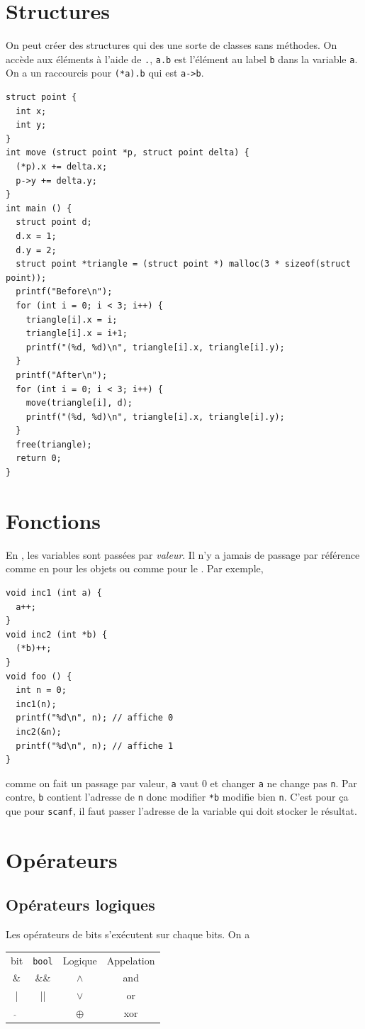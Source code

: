 \section{Structures}
On peut créer des structures qui des une sorte de classes sans méthodes.
On accède aux éléments à l'aide de \lstinline|.|, \lstinline|a.b|
est l'élément au label \lstinline|b| dans la variable \lstinline|a|.
On a un raccourcis pour \lstinline|(*a).b| qui est \lstinline|a->b|.
\begin{lstlisting}
struct point {
  int x;
  int y;
}
int move (struct point *p, struct point delta) {
  (*p).x += delta.x;
  p->y += delta.y;
}
int main () {
  struct point d;
  d.x = 1;
  d.y = 2;
  struct point *triangle = (struct point *) malloc(3 * sizeof(struct point));
  printf("Before\n");
  for (int i = 0; i < 3; i++) {
    triangle[i].x = i;
    triangle[i].x = i+1;
    printf("(%d, %d)\n", triangle[i].x, triangle[i].y);
  }
  printf("After\n");
  for (int i = 0; i < 3; i++) {
    move(triangle[i], d);
    printf("(%d, %d)\n", triangle[i].x, triangle[i].y);
  }
  free(triangle);
  return 0;
}
\end{lstlisting}

\section{Fonctions}
En \clang{}, les variables sont passées par \emph{valeur}.
Il n'y a jamais de passage par référence comme en \java{} pour les objets
ou comme pour le \oz{}.
Par exemple,
\begin{lstlisting}
void inc1 (int a) {
  a++;
}
void inc2 (int *b) {
  (*b)++;
}
void foo () {
  int n = 0;
  inc1(n);
  printf("%d\n", n); // affiche 0
  inc2(&n);
  printf("%d\n", n); // affiche 1
}
\end{lstlisting}
comme on fait un passage par valeur,
\lstinline|a| vaut 0 et changer \lstinline|a| ne change pas \lstinline|n|.
Par contre, \lstinline|b| contient l'adresse de \lstinline|n| donc modifier
\lstinline|*b| modifie bien \lstinline|n|.
C'est pour ça que pour \lstinline|scanf|,
il faut passer l'adresse de la variable qui doit stocker le résultat.

\section{Opérateurs}
\subsection{Opérateurs logiques}
Les opérateurs de bits s'exécutent sur chaque bits.
On a
\begin{center}
  \begin{tabular}{cccc}
    \clang{} bit & \clang{} \lstinline|bool| & Logique & Appelation\\
    \& & \&\& & $\land$ & and\\
    | & || & $\lor$ & or\\
    $\hat{}$ &  & $\oplus$ & xor
  \end{tabular}
\end{center}


